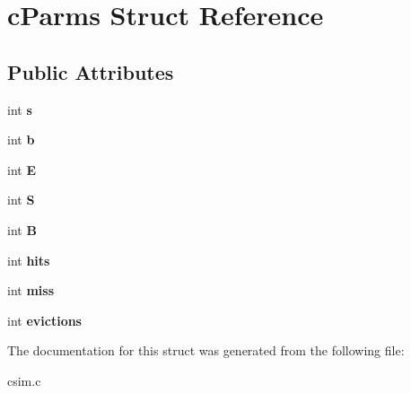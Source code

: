 \hypertarget{structcParms}{}\section{c\+Parms Struct Reference}
\label{structcParms}
\subsection*{Public Attributes}
\begin{DoxyCompactItemize}
\item 
\mbox{\label{structcParms_a75cdd22d80389ca21a039d94b9090821}} 
int {\bfseries s}
\item 
\mbox{\label{structcParms_a7c0bb31ef8dafbe4b5cb65179537e660}} 
int {\bfseries b}
\item 
\mbox{\label{structcParms_a81eebd3e37443461595210cf7dd47e99}} 
int {\bfseries E}
\item 
\mbox{\label{structcParms_a1f1aad99e596fc5af48215c8b253531a}} 
int {\bfseries S}
\item 
\mbox{\label{structcParms_a7b6138b85b65214d7defa3982d9b7c0a}} 
int {\bfseries B}
\item 
\mbox{\label{structcParms_acf2eeddce8c95581555cd849111be181}} 
int {\bfseries hits}
\item 
\mbox{\label{structcParms_a6eb96ebf4fcb4ff209b61b333e135ec3}} 
int {\bfseries miss}
\item 
\mbox{\label{structcParms_afbd31f88c31a4a7f4c0dd91bc97ce726}} 
int {\bfseries evictions}
\end{DoxyCompactItemize}


The documentation for this struct was generated from the following file\+:\begin{DoxyCompactItemize}
\item 
csim.\+c\end{DoxyCompactItemize}
